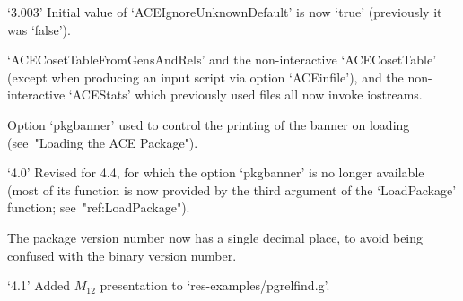 \item{`3.003'}
Initial value of `ACEIgnoreUnknownDefault' is now  `true'  (previously
it was `false').

\item{}
`ACECosetTableFromGensAndRels' and the non-interactive `ACECosetTable'
(except when producing an input script via  option  `ACEinfile'),  and
the non-interactive `ACEStats' which previously  used  files  all  now
invoke iostreams.

\item{}
Option `pkgbanner' used to control  the  printing  of  the  banner  on
loading (see~"Loading the ACE Package").

\item{`4.0'}
Revised for {\GAP} 4.4, for which the option `pkgbanner' is no  longer
available (most of its function is now provided by the third  argument
of the `LoadPackage' function; see~"ref:LoadPackage").

\item{}
The package version number now has a single decimal  place,  to  avoid
being confused with the binary version number.

\item{`4.1'}
Added $M_{12}$ presentation to `res-examples/pgrelfind.g'.

\endlist

